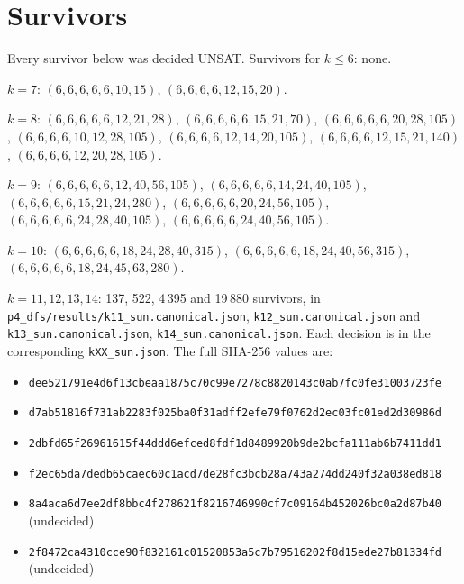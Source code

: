 \documentclass[11pt]{article}
\theoremstyle{definition}
\theoremstyle{remark}
\begin{document}
\appendix
\section{Survivors}\label{app:surv}

Every survivor below was decided UNSAT. Survivors for $k\le6$: none.

\smallskip\noindent$k=7$: $(6,6,6,6,6,10,15)$, $(6,6,6,6,12,15,20)$.

\smallskip\noindent$k=8$:
$(6,6,6,6,6,12,21,28)$, $(6,6,6,6,6,15,21,70)$, $(6,6,6,6,6,20,28,105)$, $(6,6,6,6,10,12,28,105)$,
$(6,6,6,6,12,14,20,105)$, $(6,6,6,6,12,15,21,140)$, $(6,6,6,6,12,20,28,105)$.

\smallskip\noindent$k=9$:
$(6,6,6,6,6,12,40,56,105)$, $(6,6,6,6,6,14,24,40,105)$, $(6,6,6,6,6,15,21,24,280)$,
$(6,6,6,6,6,20,24,56,105)$, $(6,6,6,6,6,24,28,40,105)$, $(6,6,6,6,6,24,40,56,105)$.

\smallskip\noindent$k=10$:
$(6,6,6,6,6,18,24,28,40,315)$, $(6,6,6,6,6,18,24,40,56,315)$, $(6,6,6,6,6,18,24,45,63,280)$.

\smallskip\noindent$k=11,12,13,14$: 137, 522, 4\,395 and 19\,880 survivors, in
\texttt{p4\_dfs/results/k11\_sun.canonical.json}, \texttt{k12\_sun.canonical.json} and
\texttt{k13\_sun.canonical.json}, \texttt{k14\_sun.canonical.json}. Each decision is in the
corresponding \texttt{kXX\_sun.json}.
The full SHA-256 values are:
\begin{itemize}\footnotesize
\item[$k=11$:] \texttt{dee521791e4d6f13cbeaa1875c70c99e7278c8820143c0ab7fc0fe31003723fe}
\item[$k=12$:] \texttt{d7ab51816f731ab2283f025ba0f31adff2efe79f0762d2ec03fc01ed2d30986d}
\item[$k=13$:] \texttt{2dbfd65f26961615f44ddd6efced8fdf1d8489920b9de2bcfa111ab6b7411dd1}
\item[$k=14$:] \texttt{f2ec65da7dedb65caec60c1acd7de28fc3bcb28a743a274dd240f32a038ed818}
\item[$k=15$:] \texttt{8a4aca6d7ee2df8bbc4f278621f8216746990cf7c09164b452026bc0a2d87b40} (undecided)
\item[$k=16$:] \texttt{2f8472ca4310cce90f832161c01520853a5c7b79516202f8d15ede27b81334fd} (undecided)
\end{itemize}
\end{document}
